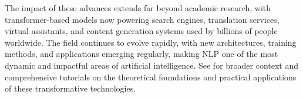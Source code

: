 The impact of these advances extends far beyond academic research, with transformer-based models now powering search engines, translation services, virtual assistants, and content generation systems used by billions of people worldwide. The field continues to evolve rapidly, with new architectures, training methods, and applications emerging regularly, making NLP one of the most dynamic and impactful areas of artificial intelligence. See \textcite{GoodfellowEtAl2016,Prince2023,D2LChapterAttention} for broader context and comprehensive tutorials on the theoretical foundations and practical applications of these transformative technologies.


